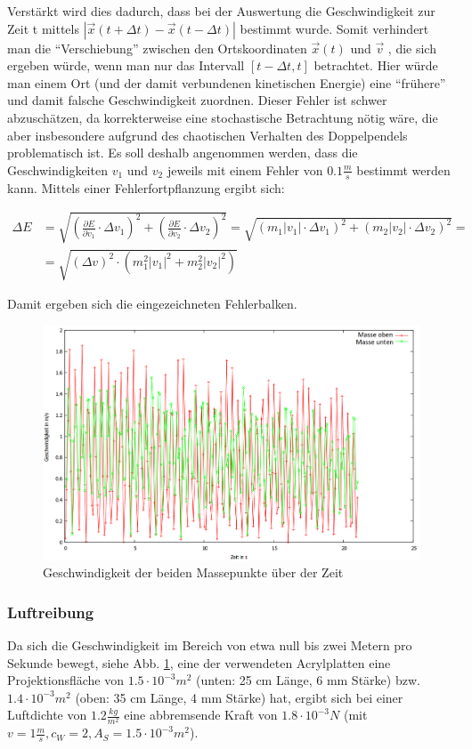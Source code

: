 Verstärkt wird dies dadurch, dass bei der Auswertung die Geschwindigkeit zur Zeit t mittels $ |\vec{x}(t+\Delta t) - \vec{x}(t-\Delta t)| $ bestimmt wurde. Somit verhindert man die \enquote{Verschiebung} zwischen den Ortskoordinaten $  \vec{x} (t) $ und $ \vec{v} $ , die sich ergeben würde, wenn man nur das Intervall $ [t - \Delta t, t] $ betrachtet. Hier würde man einem Ort (und der damit verbundenen kinetischen Energie) eine \enquote{frühere} und damit falsche Geschwindigkeit zuordnen. 
Dieser Fehler ist schwer abzuschätzen, da korrekterweise eine stochastische Betrachtung nötig wäre, die aber insbesondere aufgrund des chaotischen Verhalten des Doppelpendels problematisch ist. 
Es soll deshalb angenommen werden, dass die Geschwindigkeiten $ v_1 $ und $ v_2 $ jeweils mit einem Fehler von $ 0.1 \frac{m}{s} $ bestimmt werden kann. Mittels einer Fehlerfortpflanzung ergibt sich: 

\begin{align}
\Delta E &= \sqrt{(\frac{\partial E}{\partial v_1} \cdot \Delta v_1)^2 + (\frac{\partial E}{\partial v_2} \cdot \Delta v_2)^2} = \sqrt{(m_1 |v_1| \cdot \Delta v_1)^2 + (m_2 |v_2| \cdot \Delta v_2)^2}= \nonumber \\ &= \sqrt{(\Delta v)^2 \cdot (m_1^2 |v_1|^2 + m_2^2 |v_2|^2)}
\end{align}

Damit ergeben sich die eingezeichneten Fehlerbalken. 


\begin{figure}
        \includegraphics[width=.9\textwidth]{images/v_ueber_t_neu.png}
\caption{Geschwindigkeit der beiden Massepunkte über der Zeit}
\label{v_ueber_t}
\end{figure}


\subsubsection{Luftreibung}
Da sich die Geschwindigkeit im Bereich von etwa null bis zwei Metern pro Sekunde bewegt, siehe Abb. \ref{v_ueber_t}, eine der verwendeten Acrylplatten eine Projektionsfläche von $ 1.5 \cdot 10^{-3} m^2$ (unten: 25 cm Länge, 6 mm Stärke) bzw. $ 1.4 \cdot 10^{-3} m^2$ (oben: 35 cm Länge, 4 mm Stärke) hat, ergibt sich bei einer Luftdichte von $ 1.2 \frac{kg}{m^2} $ eine abbremsende Kraft von $ 1.8 \cdot 10^{-3} N $ (mit $ v = 1 \frac{m}{s}, c_W = 2, A_S = 1.5 \cdot 10^{-3} m^2 $). 

